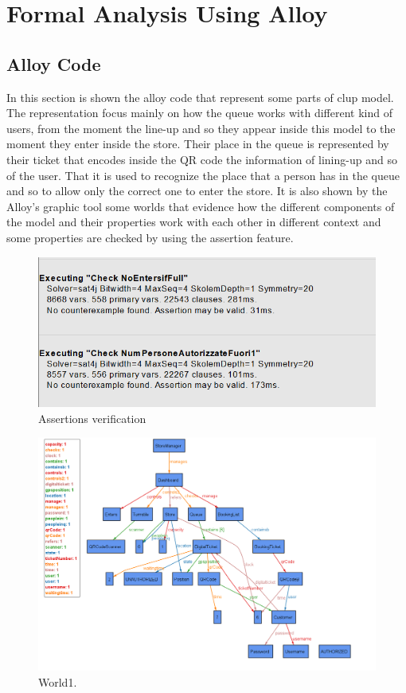 \chapter{Formal Analysis Using Alloy}

\section{Alloy Code}

In this section is shown the alloy code that represent some parts of \gls{clup} model. The representation focus mainly on how the queue works with different kind of users, from the moment the line-up and so they appear inside this model to the moment they enter inside the store. Their place in the queue is represented by their ticket that encodes inside the QR code the information of lining-up and so of the user. That it is used to recognize the place that a person has in the queue and so to allow only the correct one to enter the store.
It is also shown by the Alloy’s graphic tool some worlds that evidence how the different components of the model and their properties work with each other in different context and some properties are checked by using the assertion feature. 




\begin{figure}[H]
	\centering
	\includegraphics[width=\textwidth]{images/Assertions.png}
	\caption{Assertions verification}
	\label{figure: Assertions verification}
\end{figure}

\begin{figure}
	\includegraphics[width=1.0\textwidth]{images/AlloyW1.png}
	\caption{World1.}
	\label{figure: World1}
\end{figure}

